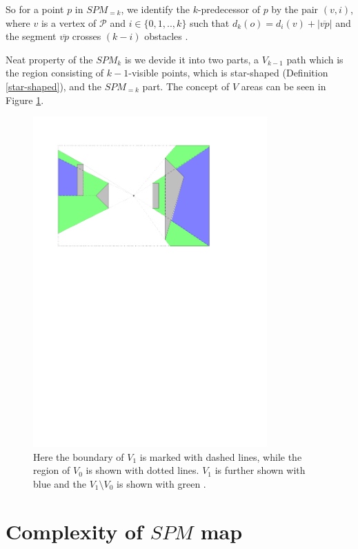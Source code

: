 So for a point $p$ in $SPM_{=k}$, we identify the $k$-predecessor of $p$ by the pair $(v,i)$, where $v$
is a vertex of $\mathcal{P}$ and $i \in \{0,1,..,k\}$ such that $d_k(o) = d_i(v) + |\overline{vp}|$ and the
segment $\overline{vp}$ crosses $(k-i)$ obstacles \cite{HershbergerKS17}.

Neat property of the $SPM_k$ is we devide it into two parts, a $V_{k-1}$ path which is the region consisting of
$k-1$-visible points, which is star-shaped (Definition \ref{star-shaped}), and the $SPM_{=k}$ part. The concept of $V$ areas can be seen in
Figure \ref{fig:regions}.

\begin{figure}[H] 
	\centering
	\includegraphics[width=0.8\textwidth]{figures/regions.pdf}
	\caption{Here the boundary of $V_1$ is marked with dashed lines, while the region of $V_0$ is shown with 
	         dotted lines. $V_1$ is further shown with blue and the $V_1 \setminus V_0$ is shown with green
	         \cite{HershbergerKS17}.}
	\label{fig:regions} 
\end{figure}

\section{Complexity of $SPM$ map}

